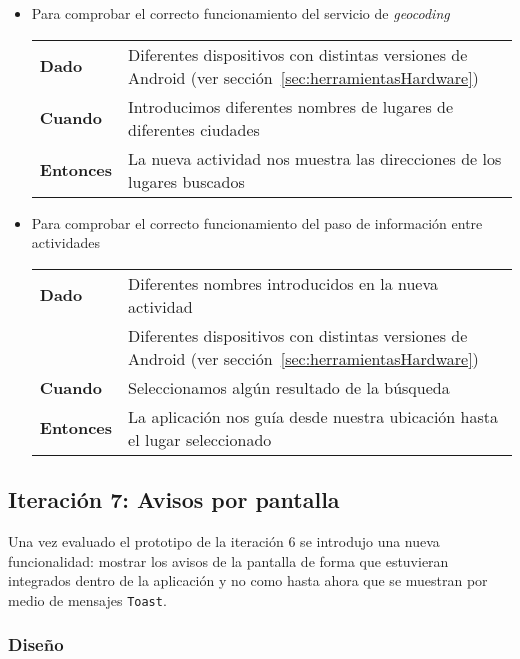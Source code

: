 \begin{itemize}
  \item Para comprobar el correcto funcionamiento del servicio de \emph{geocoding}

  \begin{tabular}{p{}p{}}
    \hline
    \textbf{Dado}     & Diferentes dispositivos con distintas versiones de Android (ver
                        sección~\ref{sec:herramientasHardware}) \\
    \textbf{Cuando}   & Introducimos diferentes nombres de lugares de diferentes ciudades \\
    \textbf{Entonces} & La nueva actividad nos muestra las direcciones de los lugares buscados \\
    \hline
  \end{tabular}

  \item Para comprobar el correcto funcionamiento del paso de información entre actividades

  \begin{tabular}{p{}p{}}
    \hline
    \textbf{Dado}     & Diferentes nombres introducidos en la nueva actividad \\
                      & Diferentes dispositivos con distintas versiones de Android (ver
                        sección~\ref{sec:herramientasHardware}) \\
    \textbf{Cuando}   & Seleccionamos algún resultado de la búsqueda \\
    \textbf{Entonces} & La aplicación nos guía desde nuestra ubicación hasta el lugar seleccionado\\
    \hline
  \end{tabular}
\end{itemize}

\subsection{Iteración 7: Avisos por pantalla}
\label{sec:ite7}

Una vez evaluado el prototipo de la iteración 6 se introdujo una nueva funcionalidad: mostrar los
avisos de la pantalla de forma que estuvieran integrados dentro de la aplicación y no como hasta
ahora que se muestran por medio de mensajes \texttt{Toast}.

\subsubsection{Diseño}

